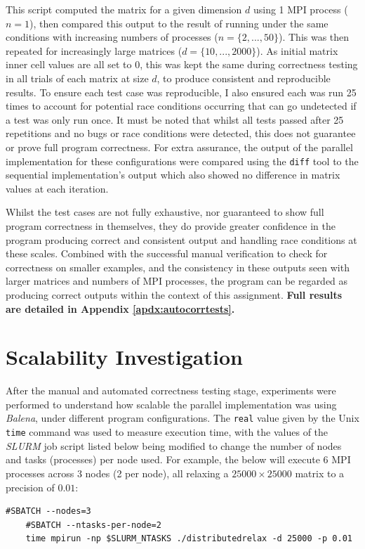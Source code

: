 \documentclass[11pt]{article}
\begin{document}
This script computed the matrix for a given dimension $d$ using 1 MPI process ($n=1$), then compared this output to the result of running under the same conditions with increasing numbers of processes ($n=\{2,...,50\}$).  This was then repeated for increasingly large matrices ($d=\{10,...,2000\}$).  As initial matrix inner cell values are all set to 0, this was kept the same during correctness testing in all trials of each matrix at size $d$, to produce consistent and reproducible results. To ensure each test case was reproducible, I also ensured each was run 25 times to account for potential race conditions occurring that can go undetected if a test was only run once.  It must be noted that whilst all tests passed after 25 repetitions and no bugs or race conditions were detected, this does not guarantee or prove full program correctness. For extra assurance, the output of the parallel implementation for these configurations were compared using the \texttt{diff} tool to the sequential implementation's output which also showed no difference in matrix values at each iteration.

Whilst the test cases are not fully exhaustive, nor guaranteed to show full program correctness in themselves, they do provide greater confidence in the program producing correct and consistent output and handling race conditions at these scales. Combined with the successful manual verification to check for correctness on smaller examples, and the consistency in these outputs seen with larger matrices and numbers of MPI processes, the program can be regarded as producing correct outputs within the context of this assignment. \textbf{Full results are detailed in Appendix \ref{apdx:autocorrtests}.} 

\newpage
{\color{indigo}
\section{Scalability Investigation}}
After the manual and automated correctness testing stage, experiments were performed to understand how scalable the parallel implementation was using \textsl{Balena}, under different program configurations.  The \texttt{real} value given by the Unix \texttt{time} command was used to measure execution time, with the values of the \textsl{SLURM} job script listed below being modified to change the number of nodes and tasks (processes) per node used. For example, the below will execute 6 MPI processes across 3 nodes (2 per node), all relaxing a $25000 \times 25000$ matrix to a precision of $0.01$:
\begin{lstlisting}[style=BashInputStyle]
	#SBATCH --nodes=3
	#SBATCH --ntasks-per-node=2
	time mpirun -np $SLURM_NTASKS ./distributedrelax -d 25000 -p 0.01
\end{lstlisting}
\end{document}

